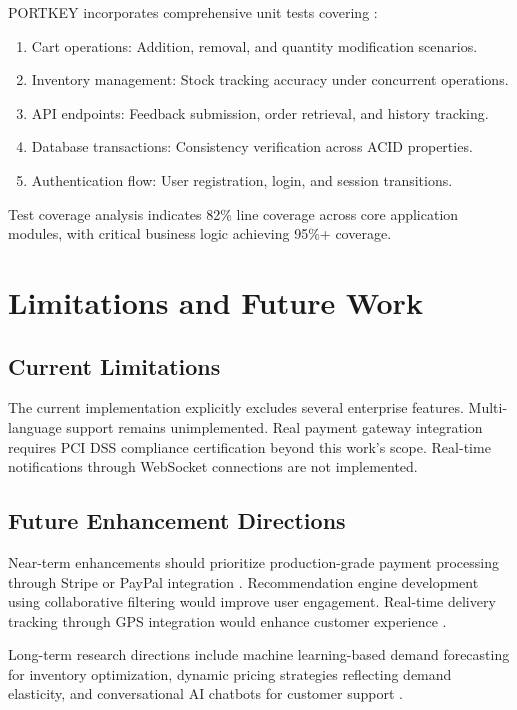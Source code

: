 \documentclass[conference]{IEEEtran}
\begin{document}
PORTKEY incorporates comprehensive unit tests covering \cite{b82, b84}:

\begin{enumerate}
    \item Cart operations: Addition, removal, and quantity modification scenarios.
    \item Inventory management: Stock tracking accuracy under concurrent operations.
    \item API endpoints: Feedback submission, order retrieval, and history tracking.
    \item Database transactions: Consistency verification across ACID properties.
    \item Authentication flow: User registration, login, and session transitions.
\end{enumerate}

Test coverage analysis indicates 82\% line coverage across core application modules, with critical business logic achieving 95\%+ coverage.

\section{Limitations and Future Work}

\subsection{Current Limitations}

The current implementation explicitly excludes several enterprise features. Multi-language support remains unimplemented. Real payment gateway integration requires PCI DSS compliance certification beyond this work's scope. Real-time notifications through WebSocket connections are not implemented.

\subsection{Future Enhancement Directions}

Near-term enhancements should prioritize production-grade payment processing through Stripe or PayPal integration \cite{b76}. Recommendation engine development using collaborative filtering would improve user engagement. Real-time delivery tracking through GPS integration would enhance customer experience \cite{b79}.

Long-term research directions include machine learning-based demand forecasting for inventory optimization, dynamic pricing strategies reflecting demand elasticity, and conversational AI chatbots for customer support \cite{b71, b88}.
\end{document}
